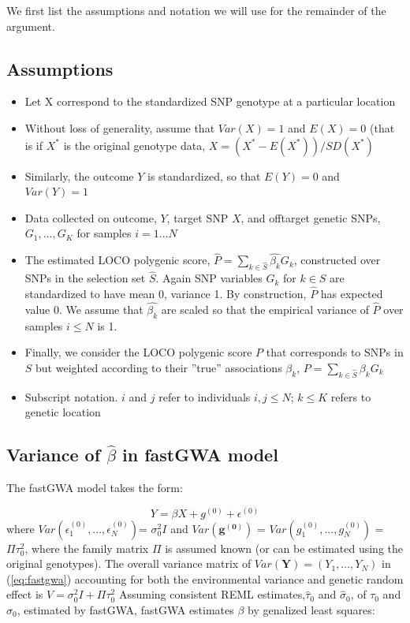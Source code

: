 \documentclass[10pt]{article}
\begin{document}
We first list the assumptions and notation we will use for the remainder of the argument.




\subsection*{Assumptions}
\begin{itemize}
\item Let X correspond to the standardized SNP genotype at a particular location
\item Without loss of generality, assume that $Var(X)=1$ and $E(X)=0$ (that is if $X^*$ is the original genotype data, $X=(X^*-E(X^*))/SD(X^*)$
\item Similarly, the outcome $Y$ is standardized, so that $E(Y)=0$ and $Var(Y)=1$
\item Data collected on outcome, $Y$, target SNP $X$, and offtarget genetic SNPs, $G_{1},...,G_{K}$ for samples $i = 1 \dots N$
\item The estimated LOCO polygenic score, $\hat{P} = \sum_{k \in \hat{S}}\hat{\beta_{k}}G_{k}$, constructed over SNPs in the selection set $\hat{S}$.  Again SNP variables $G_{k}$ for $k \in S$ are standardized to have mean 0, variance 1.  By construction, $\hat{P}$ has expected value 0.  We assume that $\hat{\beta_{k}}$ are scaled so that the empirical variance of $\hat{P}$ over samples $i \leq N$ is 1.
\item Finally, we consider the LOCO polygenic score $P$ that corresponds to SNPs in $S$ but weighted according to their ''true'' associations $\beta_{k}$, $P = \sum_{k \in \hat{S}}\beta_{k}G_{k}$
\item Subscript notation.  $i$ and $j$ refer to individuals $i, j \leq N$; $k \leq K$ refers to genetic location 
\end{itemize}




\subsection*{Variance of $\hat{\beta}$ in fastGWA model}

The fastGWA model takes the form:

\begin{equation}
Y = \beta X + g^{(0)} + \epsilon^{(0)}  \label{eq:fastgwa}
\end{equation}
where $Var(\epsilon^{(0)}_{1},...,\epsilon^{(0)}_{N})$= $\sigma_{0}^2 I$ and $Var(\mathbf{g^{(0)}})$ = $Var(g^{(0)}_{1},...,g^{(0)}_{N})$ = $\Pi \tau_0^2$, where the family matrix $\Pi$ is assumed known (or can be estimated using the original genotypes).  The overall variance matrix of $Var(\mathbf{Y})=(Y_{1},...,Y_{N})$ in (\ref{eq:fastgwa}) accounting for both the environmental variance and genetic random effect is $V=  \sigma_{0}^2 I + \Pi \tau_0^2$   Assuming consistent REML estimates,$\hat{\tau}_0$ and $\hat{\sigma}_{0}$, of $\tau_0$ and $\sigma_{0}$, estimated by fastGWA, fastGWA estimates $\beta$ by genalized least squares: 
\end{document}
